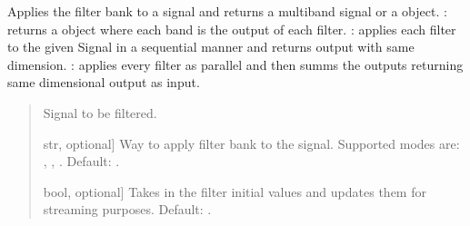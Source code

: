 \documentclass[letterpaper,10pt,english]{sphinxmanual}
\begin{document}
\begin{fulllineitems}
\begin{fulllineitems}
\end{fulllineitems}


\begin{fulllineitems}
\label{\detokenize{classes:dsptoolbox.classes.filterbank.FilterBank.filter_signal}}
\pysigstartsignatures
{}
\pysigstopsignatures
\sphinxAtStartPar
Applies the filter bank to a signal and returns a multiband signal
or a  object.
: returns a  object where each band is
the output of each filter.
: applies each filter to the given Signal in a sequential
manner and returns output with same dimension.
: applies every filter as parallel and then summs the outputs
returning same dimensional output as input.
\begin{quote}\begin{description}
\begin{description}
\sphinxlineitem{\sphinxstylestrong{signal}}{[}\sphinxtitleref{Signal}{]}
\sphinxAtStartPar
Signal to be filtered.

\sphinxlineitem{\sphinxstylestrong{mode}}{[}str, optional{]}
\sphinxAtStartPar
Way to apply filter bank to the signal. Supported modes are:
, , . Default: .

\sphinxlineitem{\sphinxstylestrong{activate\_zi}}{[}bool, optional{]}
\sphinxAtStartPar
Takes in the filter initial values and updates them for
streaming purposes. Default: .


\end{description}
\end{description}
\end{quote}
\end{fulllineitems}
\end{fulllineitems}
\end{document}
